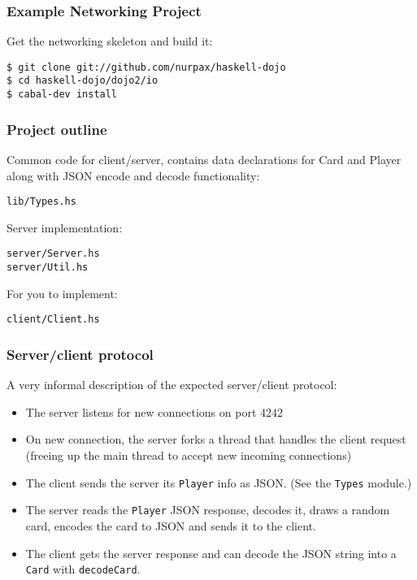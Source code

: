 \documentclass{beamer}
\begin{document}
\begin{frame}[fragile]
\frametitle{Example Networking Project}

Get the networking skeleton and build it:

\begin{verbatim}
$ git clone git://github.com/nurpax/haskell-dojo
$ cd haskell-dojo/dojo2/io
$ cabal-dev install
\end{verbatim}

\end{frame}


\begin{frame}[fragile]
\frametitle{Project outline}

Common code for client/server, contains data declarations for Card and
Player along with JSON encode and decode functionality:

\begin{verbatim}
lib/Types.hs
\end{verbatim}

Server implementation:

\begin{verbatim}
server/Server.hs
server/Util.hs
\end{verbatim}

For you to implement:

\begin{verbatim}
client/Client.hs
\end{verbatim}

\end{frame}

\begin{frame}[fragile]
\frametitle{Server/client protocol}

A very informal description of the expected server/client protocol:

\begin{itemize}
  \item The server listens for new connections on port 4242
  \item On new connection, the server forks a thread that handles the
    client request (freeing up the main thread to accept new incoming
    connections)
  \item The client sends the server its \verb+Player+ info as
    JSON.  (See the \verb+Types+ module.)
  \item The server reads the \verb+Player+ JSON response, decodes it,
    draws a random card, encodes the card to JSON and sends it to the
    client.
  \item The client gets the server response and can decode the JSON
    string into a \verb+Card+ with \verb+decodeCard+.
\end{itemize}

\end{frame}
\end{document}

